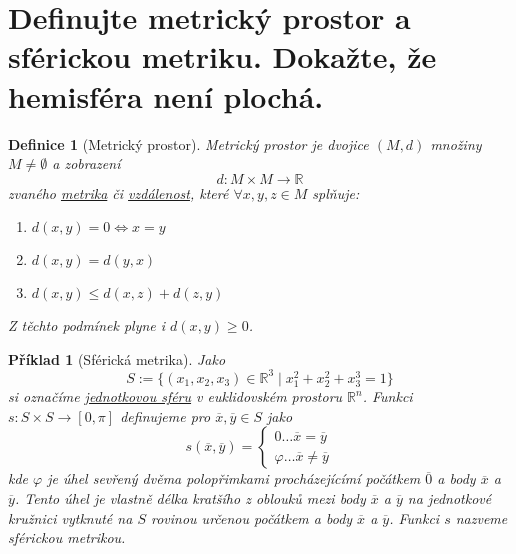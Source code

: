 \documentclass[11pt]{article}
\theoremstyle{nontheoremstyle}
\newtheorem*{definition}{Definice}
\newtheorem*{example}{Příklad}
\theoremstyle{nontheoremstylenodot}
\theoremstyle{theoremstyle}
\begin{document}
\section{Definujte metrický prostor a sférickou metriku. Dokažte, že hemisféra není plochá.}

\begin{definition}[Metrický prostor]
    Metrický prostor je dvojice $(M,d)$ množiny $M\neq \emptyset$ a zobrazení \[d: M \times M \to \mathbb{R}\]
    zvaného \underline{metrika} či \underline{vzdálenost}, které $\forall x,y,z \in M$ splňuje:
    \begin{enumerate}
        \item $d(x,y) = 0 \iff x=y$
        \item $d(x,y) = d(y,x)$
        \item $d(x,y) \leq d(x,z) + d(z,y)$
    \end{enumerate}
    Z těchto podmínek plyne i $d(x,y) \geq 0$.
\end{definition}

\begin{example}[Sférická metrika]
    Jako \[S := \{ (x_1,x_2,x_3) \in \mathbb{R}^3 \mid x_1^2 + x_2^2 + x_3^3 = 1 \}\] si označíme \underline{jednotkovou sféru} v
    euklidovském prostoru $\mathbb{R}^n$. Funkci $s: S\times S \to [0,\pi]$ definujeme pro $\overline{x}, \overline{y} \in S$
    jako \[ s(\overline{x}, \overline{y}) = \begin{cases}
        0 \dots \overline{x} = \overline{y}\\
        \varphi \dots \overline{x} \neq \overline{y}
    \end{cases} \]
    kde $\varphi$ je úhel sevřený dvěma polopřimkami procházejícímí počátkem $\overline{0}$ a body $\overline{x}$ a $\overline{y}$.
    Tento úhel je vlastně délka kratšího z oblouků mezi body $\overline{x}$ a $\overline{y}$ na jednotkové kružnici vytknuté na $S$ rovinou určenou
    počátkem a body $\overline{x}$ a $\overline{y}$. Funkci $s$ nazveme sférickou metrikou.
\end{example}
\end{document}

